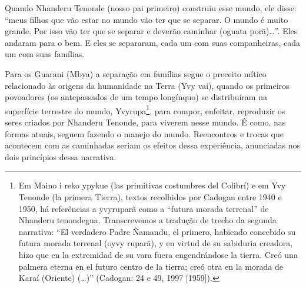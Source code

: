 Quando Nhanderu Tenonde (nosso pai primeiro) construiu esse mundo, ele
disse: ``meus filhos que vão estar no mundo vão ter que se separar. O
mundo é muito grande. Por isso vão ter que se separar e deverão
caminhar (oguata porã)\ldots{}''. Eles andaram para o bem. E eles se
separaram, cada um com suas companheiras, cada um com suas famílias. 

Para os Guarani (Mbya) a separação em famílias segue o preceito mítico
relacionado às origens da humanidade na Terra (Yvy vai), quando os
primeiros povoadores (os antepassados de um tempo longínquo) se
distribuíram na superfície terrestre do mundo, Yvyrupa\footnote{Em
Maino i reko ypykue (las primitivas costumbres del Colibrí) e em Yvy
Tenonde (la primera Tierra), textos recolhidos por Cadogan entre 1940 e
1950, há referências a yvyruparã como a ``futura morada terrenal'' de
Nhanderu tenondegua. Transcrevemos a tradução de trecho da segunda
narrativa: ``El verdadero Padre Ñamandu, el primero, habiendo concebido
su futura morada terrenal (oyvy ruparã), y en virtud de su sabiduria
creadora, hizo que en la extremidad de su vara fuera engendrándose la
tierra. Creó una palmera eterna en el futuro centro de la tierra; creó
otra en la morada de Karaí (Oriente) (\ldots{})'' (Cadogan: 24 e 49, 1997
[1959]).}, para compor, enfeitar, reproduzir os seres criados por
Nhanderu Tenonde, para viverem nesse mundo.  É como, nas formas atuais,
seguem fazendo o manejo do mundo. Reencontros e trocas que acontecem
com as caminhadas seriam os efeitos dessa experiência, anunciadas nos
dois princípios dessa narrativa.

